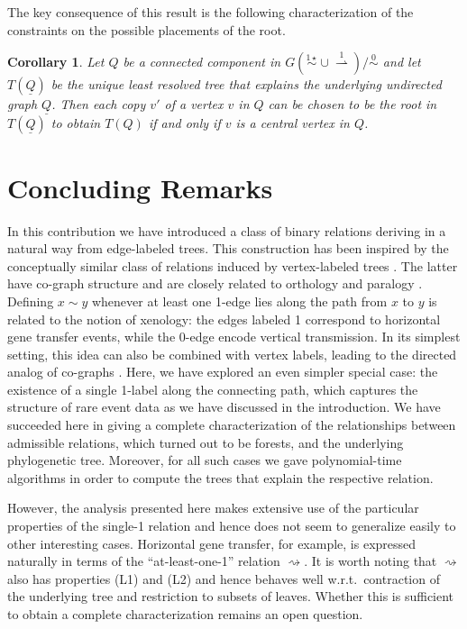 \documentclass[smallextended]{svjour3}
\let\cite\citep
\newcommand{\Ro}{\mathrel{\overset{0}{\sim}}}
\newcommand{\Rlstar}{\mathrel{\overset{1\star}{\sim}}}
\newcommand{\Rld}{\mathrel{\overset{1}{\rightharpoonup}}}
\newcommand{\Rd}{\mathrel{\rightsquigarrow}}
\newtheorem{cor}[thm]{Corollary}
\begin{document}
The key consequence of this result is the following characterization of the
constraints on the possible placements of the root.

\begin{cor}
  Let $Q$ be a connected component in $G(\Rlstar\cup\Rld)/\Ro$ and let
  $T(\underline{Q})$ be the unique least resolved tree that explains the
  underlying undirected graph $\underline{Q}$.  Then each copy $v'$ of a
  vertex $v$ in $Q$ can be chosen to be the root in $T(\underline{Q})$ to
  obtain $T(Q)$ if and only if $v$ is a central vertex in $Q$.
\end{cor}

\section{Concluding Remarks} 

In this contribution we have introduced a class of binary relations
deriving in a natural way from edge-labeled trees. This construction has
been inspired by the conceptually similar class of relations induced by
vertex-labeled trees \cite{HW:17}.  The latter have co-graph structure and
are closely related to orthology and paralogy
\cite{Hellmuth:13a,Lafond:14,Hellmuth:15a,HW:15}. Defining $x\sim y$
whenever at least one 1-edge lies along the path from $x$ to $y$ is related
to the notion of xenology: the edges labeled 1 correspond to horizontal
gene transfer events, while the 0-edge encode vertical transmission. In its
simplest setting, this idea can also be combined with vertex labels,
leading to the directed analog of co-graphs \cite{HSW:16}. Here, we have
explored an even simpler special case: the existence of a single 1-label
along the connecting path, which captures the structure of rare event data
as we have discussed in the introduction.  We have succeeded here in giving
a complete characterization of the relationships between admissible
relations, which turned out to be forests, and the underlying phylogenetic
tree.  Moreover, for all such cases we gave polynomial-time algorithms in
order to compute the trees that explain the respective relation.

However, the analysis presented here makes extensive use of the particular
properties of the single-1 relation and hence does not seem to generalize
easily to other interesting cases. Horizontal gene transfer, for example,
is expressed naturally in terms of the ``at-least-one-1'' relation
$\Rd$. It is worth noting that $\Rd$ also has properties (L1) and (L2) and
hence behaves well w.r.t.\ contraction of the underlying tree and
restriction to subsets of leaves. Whether this is sufficient to obtain a
complete characterization remains an open question.
\end{document}
